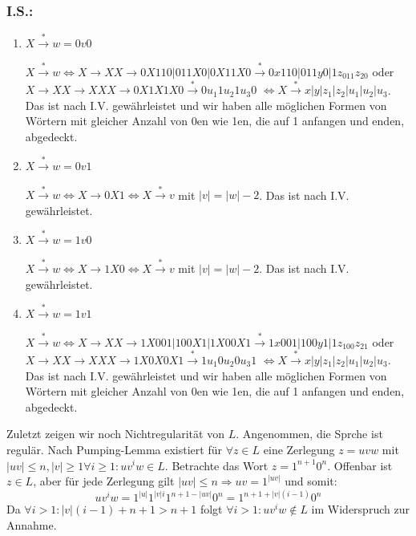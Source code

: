 \documentclass{article}
\begin{document}
\subsubsection*{I.S.:}
\begin{enumerate}
	\item $X \overset{*}{\to} w = 0v0$
	
	$X \overset{*}{\to} w \Leftrightarrow X \to XX \to 0X110 | 011X0 | 0X11X0 \overset{*}{\to} 0x110 | 011y0 | 1z_011z_20$ oder $X \to XX \to XXX \to 0X1X1X0 \overset{*}{\to} 0u_1 1 u_2 1 u_3 0$ $\Leftrightarrow X \overset{*}{\to} x | y | z_1 | z_2 | u_1 | u_2 | u_3$. Das ist nach I.V. gewährleistet und wir haben alle möglichen Formen von Wörtern mit gleicher Anzahl von 0en wie 1en, die auf 1 anfangen und enden, abgedeckt.
	
	\item $X \overset{*}{\to} w = 0v1$
	
	$X \overset{*}{\to} w \Leftrightarrow X \to 0X1 \Leftrightarrow X \overset{*}{\to} v$ mit $|v| = |w| - 2$. Das ist nach I.V. gewährleistet.
	
	\item $X \overset{*}{\to} w = 1v0$
	
	$X \overset{*}{\to} w \Leftrightarrow X \to 1X0 \Leftrightarrow X \overset{*}{\to} v$ mit $|v| = |w| - 2$. Das ist nach I.V. gewährleistet.
	
	\item $X \overset{*}{\to} w = 1v1$
	
	$X \overset{*}{\to} w \Leftrightarrow X \to XX \to 1X001 | 100X1 | 1X00X1 \overset{*}{\to} 1x001 | 100y1 | 1z_100z_21$ oder $X \to XX \to XXX \to 1X0X0X1 \overset{*}{\to} 1u_1 0 u_2 0 u_3 1$ $\Leftrightarrow X \overset{*}{\to} x | y | z_1 | z_2 | u_1 | u_2 | u_3$. Das ist nach I.V. gewährleistet und wir haben alle möglichen Formen von Wörtern mit gleicher Anzahl von 0en wie 1en, die auf 1 anfangen und enden, abgedeckt.
\end{enumerate}

Zuletzt zeigen wir noch Nichtregularität von $L$. Angenommen, die Sprche ist regulär. Nach Pumping-Lemma existiert für $\forall z \in L$ eine Zerlegung $z = uvw$ mit $|uv| \le n, |v| \ge 1 \forall i\ge 1 : uv^i w \in L$. Betrachte das Wort $z = 1^{n+1} 0^n$. Offenbar ist $z \in L$, aber für jede Zerlegung gilt $|uv| \le n \Rightarrow uv = 1^{|uv|}$ und somit:
\begin{equation}
	uv^iw = 1^{|u|} 1^{|v|i} 1^{n+1-|uv|} 0^n = 1^{n+1 + |v|(i-1)} 0^n
\end{equation}
Da $\forall i > 1 : |v|(i-1) + n+1 > n+1$ folgt $\forall i > 1: uv^i w \not\in L$ im Widerspruch zur Annahme.
\end{document}
